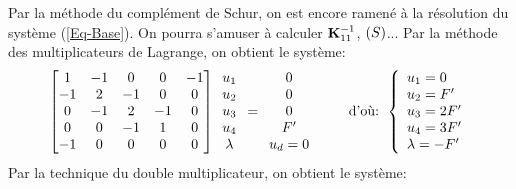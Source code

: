 \medskipvm
Par la méthode du complément de Schur, on est encore ramené à la résolution du système (\ref{Eq-Base}).
On pourra s'amuser à calculer $\mathbf{K}_{11}^{-1}$, $\left( S\right)$...
\medskipvm
Par la méthode des multiplicateurs de Lagrange, on obtient le système:
\begin{equation}
\begin{bmatrix} 1 & -1 & 0 & 0 & -1 \\ -1 & 2 & -1 & 0 & 0 \\ 0 & -1 & 2 & -1 & 0\\ 0&0&-1&1& 0 \\ -1&0&0&0&0
\end{bmatrix}
\mathbf{\begin{array}{c} u_1\\u_2\\u_3\\u_4\\ \lambda \end{array}}
=
\mathbf{\begin{array}{c} 0\\0\\0\\F' \\ u_d=0\end{array}}
\qquad \text{ d'où: } 
\left\{\begin{array}{l} u_1=0 \\ u_2=F' \\ u_3=2F' \\ u_4=3F' \\ \lambda = -F' \end{array}\right.
\end{equation}
\medskipvm
Par la technique du double multiplicateur, on obtient le système:
